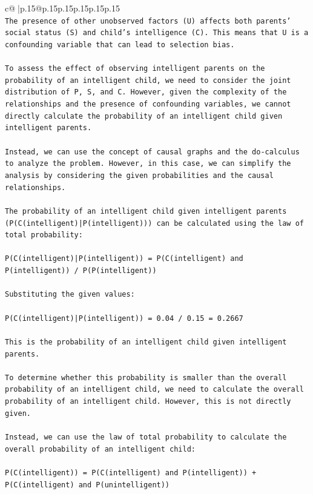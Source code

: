 \documentclass{article}
\begin{document}
{\begin{supertabular}{c@{$\;$}|p{.15\linewidth}@{}p{.15\linewidth}p{.15\linewidth}p{.15\linewidth}p{.15\linewidth}p{.15\linewidth}}
{{{\\ 
\texttt{The presence of other unobserved factors (U) affects both parents' social status (S) and child's intelligence (C). This means that U is a confounding variable that can lead to selection bias.} \\
\\ 
\texttt{To assess the effect of observing intelligent parents on the probability of an intelligent child, we need to consider the joint distribution of P, S, and C. However, given the complexity of the relationships and the presence of confounding variables, we cannot directly calculate the probability of an intelligent child given intelligent parents.} \\
\\ 
\texttt{Instead, we can use the concept of causal graphs and the do{-}calculus to analyze the problem. However, in this case, we can simplify the analysis by considering the given probabilities and the causal relationships.} \\
\\ 
\texttt{The probability of an intelligent child given intelligent parents (P(C(intelligent)|P(intelligent))) can be calculated using the law of total probability:} \\
\\ 
\texttt{P(C(intelligent)|P(intelligent)) = P(C(intelligent) and P(intelligent)) / P(P(intelligent))} \\
\\ 
\texttt{Substituting the given values:} \\
\\ 
\texttt{P(C(intelligent)|P(intelligent)) = 0.04 / 0.15 = 0.2667} \\
\\ 
\texttt{This is the probability of an intelligent child given intelligent parents.} \\
\\ 
\texttt{To determine whether this probability is smaller than the overall probability of an intelligent child, we need to calculate the overall probability of an intelligent child. However, this is not directly given.} \\
\\ 
\texttt{Instead, we can use the law of total probability to calculate the overall probability of an intelligent child:} \\
\\ 
\texttt{P(C(intelligent)) = P(C(intelligent) and P(intelligent)) + P(C(intelligent) and P(unintelligent))} \\
}}}
\end{supertabular}}
\end{document}

